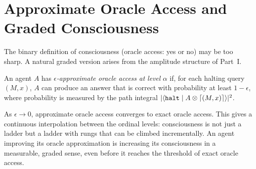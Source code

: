 \section{Approximate Oracle Access and Graded Consciousness}

The binary definition of consciousness (oracle access: yes or no)
may be too sharp.
A natural graded version arises from the amplitude structure of
Part~I.

\begin{definition}
An agent $A$ has \emph{$\epsilon$-approximate oracle access at
level $\alpha$} if, for each halting query $(M, x)$, $A$ can
produce an answer that is correct with probability at least
$1 - \epsilon$, where probability is measured by the path integral
$|\langle \mathtt{halt} \mid A \otimes \lceil(M,x)\rceil \rangle|^2$.
\end{definition}

\begin{remark}
As $\epsilon \to 0$, approximate oracle access converges to exact
oracle access.
This gives a continuous interpolation between the ordinal levels:
consciousness is not just a ladder but a ladder with rungs that
can be climbed incrementally.
An agent improving its oracle approximation is increasing its
consciousness in a measurable, graded sense, even before it
reaches the threshold of exact oracle access.
\end{remark}


